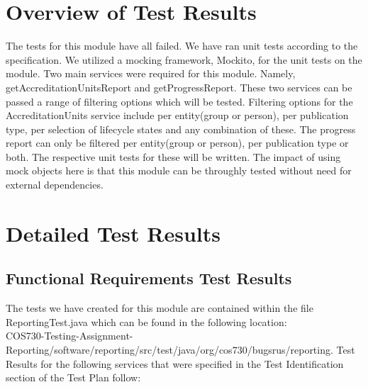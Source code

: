 
\section{Overview of Test Results}
\label{sec:overviewResults}
The tests for this module have all failed. We have ran unit tests according to the specification. We utilized a mocking framework, Mockito, for the unit tests on the module. Two main services were required for this module. Namely, getAccreditationUnitsReport and  getProgressReport. These two services can be passed a range of filtering options which will be tested. Filtering options for the AccreditationUnits service include per entity(group or person), per publication type, per selection of lifecycle states and any combination of these. The progress report can only be filtered per entity(group or person), per publication type or both. The respective unit tests for these will be written. The impact of using mock objects here is that this module can be throughly tested without need for external dependencies. 


\section{Detailed Test Results} 
\label{sec:detailedResults}  
\subsection{Functional Requirements Test Results}
The tests we have created for this module are contained within the file ReportingTest.java which can be found in the following location:
\\  COS730-Testing-Assignment-Reporting/software/reporting/src/test/java/org/cos730/bugsrus/reporting.
Test Results for the following services that were specified in the Test Identification section of the Test Plan follow:  

